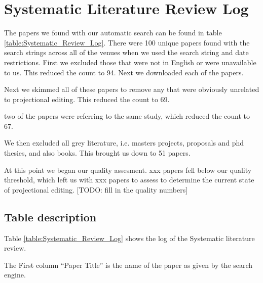 \chapter{Systematic Literature Review Log} \label{Appendix:SLRLog}

The papers we found with our automatic search can be found in table \ref{table:Systematic_Review_Log}.
There were 100 unique papers found with the search strings across all of the venues when we used the search string and date restrictions.  
First we excluded those that were not in English or were unavailable to us.
This reduced the count to 94.
Next we downloaded each of the papers. 

Next we skimmed all of these papers to remove any that were obviously unrelated to projectional editing.
This reduced the count to 69.

two of the papers were referring to the same study, which reduced the count to 67.

We then excluded all grey literature, i.e. masters projects, proposals and phd thesies, and also books.
This brought us down to 51 papers.

At this point we began our quality assesment.
xxx papers fell below our quality threshold, which left us with xxx papers to assess to determine the current state of projectional editing.
[TODO: fill in the quality numbers]

\section{Table description}
Table \ref{table:Systematic_Review_Log} shows the log of the Systematic literature review.

The First column ``Paper Title'' is the name of the paper as given by the search engine.

